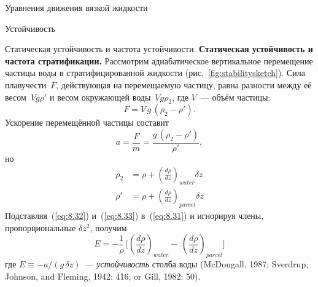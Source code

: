 \begin{chapter}{Уравнения движения вязкой жидкости}
\begin{section}{Устойчивость}
\begin{paragraph}{Статическая устойчивость и частота устойчивости.}
\textbf{Статическая устойчивость и частота стратификации.}
Рассмотрим адиабатическое вертикальное перемещение частицы воды в 
стратифицированной жидкости (рис.~\ref{fig:stabilitysketch}). 
Сила плавучести~$F$, действующая на перемещаемую
частицу, равна разности между её весом~$V g \rho '$ и весом окружающей 
воды~$V g \rho_2$, где $V$~--- объём частицы:
\begin{displaymath}
 F=V\,g\,(\rho_2-\rho{'}).
\end{displaymath}
Ускорение перемещённой частицы составит
\begin{equation}\label{eq:8.31}
 a=\frac{F}{m}=\frac{g\,(\rho_2-\rho{'})}{\rho{'}},
\end{equation}
но
\begin{align}
\rho_2  &= \rho + \left( \frac{d {\rho}}{d {z}}\right)_{water} \delta z \label{eq:8.32} \\
\rho{'} &= \rho + \left( \frac{d {\rho}}{d {z}}\right)_{parcel} \delta z \label{eq:8.33}
\end{align}
Подставляя~(\ref{eq:8.32}) и~(\ref{eq:8.33}) в~(\ref{eq:8.31}) 
и игнорируя члены, пропорциональные $\delta{z^2}$, получим
\begin{equation}\label{eq:8.34}
E = -\frac{1}{\rho}\,\Biggl[\left(\frac{d \rho}{d {z}}\right)_{water}
    -\,\left(\frac{d \rho}{d {z}}\right)_{parcel}\Biggr]
\end{equation}
где $E \equiv -a/(g \, \delta z)$~--- 
\emph{устойчивость} столба 
воды (McDougall, 1987; Sverdrup, Johnson, and Fleming, 1942: 416; or Gill,
1982: 50).
%

\end{paragraph}
\end{section}
\end{chapter}
